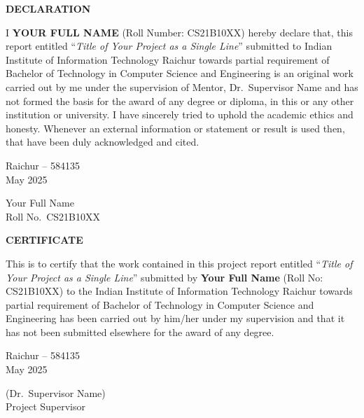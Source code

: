 \documentclass[12pt, a4paper, oneside]{report}
\newcommand{\thesisTitle}{Title of Your Project as a Single Line}
\newcommand{\studentName}{Your Full Name}
\newcommand{\rollNumber}{CS21B10XX}
\newcommand{\supervisorName}{Dr.~Supervisor Name}
\newcommand{\departmentName}{Computer Science and Engineering}
\newcommand{\submissionMonthYear}{May 2025}
\newcommand{\submissionLocation}{Raichur -- 584135}
\newcommand{\degreeName}{Bachelor of Technology}
\newcommand{\frontmatterheading}[1]{%
  \begin{center}\Large\bfseries #1\end{center}
  \vspace{0.5cm}
}
\begin{document}
\setcounter{page}{2}

\clearpage
\thispagestyle{plain}
\frontmatterheading{DECLARATION}

\noindent I \textbf{\MakeUppercase{\studentName}} (Roll Number: \rollNumber) hereby
declare that, this report entitled ``\textit{\thesisTitle}'' submitted to
Indian Institute of Information Technology Raichur towards partial requirement
of \degreeName{} in \departmentName{} is an original work carried out by me
under the supervision of Mentor, \supervisorName{} and has not formed the
basis for the award of any degree or diploma, in this or any other institution
or university. I have sincerely tried to uphold the academic ethics and
honesty. Whenever an external information or statement or result is used then,
that have been duly acknowledged and cited.

\vspace{2.5cm}
\noindent
\begin{minipage}[t]{0.5\textwidth}
\submissionLocation \\
\submissionMonthYear
\end{minipage}
\hfill
\begin{minipage}[t]{0.4\textwidth}
\raggedleft
\studentName \\
Roll No.~\rollNumber
\end{minipage}

\clearpage
\thispagestyle{plain}
\frontmatterheading{CERTIFICATE}

\noindent This is to certify that the work contained in this project report
entitled ``\textit{\thesisTitle}'' submitted by \textbf{\studentName} (Roll
No: \rollNumber) to the Indian Institute of Information Technology Raichur
towards partial requirement of \degreeName{} in \departmentName{} has been
carried out by him/her under my supervision and that it has not been submitted
elsewhere for the award of any degree.

\vspace{3cm}
\noindent
\begin{minipage}[t]{0.5\textwidth}
\submissionLocation \\
\submissionMonthYear
\end{minipage}
\hfill
\begin{minipage}[t]{0.4\textwidth}
\raggedleft
(\supervisorName) \\
Project Supervisor
\end{minipage}
\end{document}

